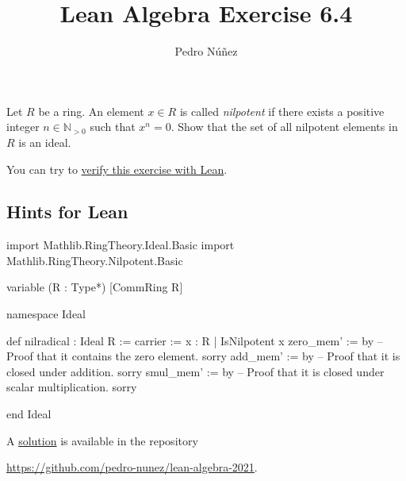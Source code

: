 \documentclass[12pt, a4paper]{article}
\title{Lean Algebra Exercise 6.4}
\author{Pedro N\'{u}\~{n}ez}
\theoremstyle{definition}
\newenvironment{xca}[1] {\renewcommand\theinnercustomthm{#1}\innercustomthm}
  {\endinnercustomthm}
\begin{document}
\begin{xca}{6.4}
  Let $R$ be a ring.
  An element $x \in R$ is called \emph{nilpotent} if there exists a positive integer $n \in \mathbb{N}_{>0}$ such that $x^{n} = 0$.
  Show that the set of all nilpotent elements in $R$ is an ideal.

  You can try to \href{https://live.lean-lang.org/#codez=JYWwDg9gTgLgBAWQIYwBYBtgCMB0AlYAOwHMAVVAU2gE8cBJAEwqXRwCEkBnYAYwChQkWIhQZs%2BImUo0cAOWDpIMCoRjsuvPnwBuSKMCRZ0FOAAo8cAFxxS1MBQBUASjgBtAMIQQIAiTh4AXS1CJBAKTjAkHhNGZnQtJgAzOEIFKCQGXhYrOFjsi0sAXj4AbzgePX0KKCtCuBKADxyLAB9cznlFCGVVOAaAXz44OAAvaogAfTCQAHJauCxqIeG4AFpVuAAFKAgIZLQUOGB4HghVJCJOODQTMZ24CmMw1Rxl4c5oKCXhjIYpilm80WbzWG22u32qEOxyOVx46AgnAoDDgAFdCEwar9jsAzq8VnAPlAvstOCBUeh%2FoCigtvit1lsdntrlD4DDgHCEUiUejMYSKug9HByegYMAwJgKmK8SCiSTBnwVCi8uggA}{verify this exercise with Lean}.
\end{xca}

\subsection*{Hints for Lean}

\begin{leancode}
  import Mathlib.RingTheory.Ideal.Basic
  import Mathlib.RingTheory.Nilpotent.Basic

  variable (R : Type*) [CommRing R]

  namespace Ideal

  def nilradical : Ideal R :=
  { carrier := {x : R | IsNilpotent x}
    zero_mem' := by
      -- Proof that it contains the zero element.
      sorry
    add_mem' := by
      -- Proof that it is closed under addition.
      sorry
    smul_mem' := by
      -- Proof that it is closed under scalar multiplication.
      sorry
  }

  end Ideal
\end{leancode}

A \href{https://github.com/pedro-nunez/lean-algebra-2021/blob/master/nilradical/solution.lean}{solution} is available in the repository
\begin{center}
  \href{https://github.com/pedro-nunez/lean-algebra-2021}{https://github.com/pedro-nunez/lean-algebra-2021}.
\end{center}

{\renewcommand{\thefootnote}{\fnsymbol{footnote}}}
\end{document}
